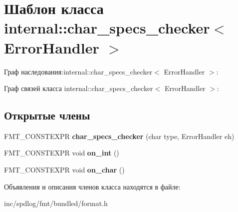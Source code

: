 \hypertarget{classinternal_1_1char__specs__checker}{}\section{Шаблон класса internal\+:\+:char\+\_\+specs\+\_\+checker$<$ Error\+Handler $>$}
\label{classinternal_1_1char__specs__checker}


Граф наследования\+:internal\+:\+:char\+\_\+specs\+\_\+checker$<$ Error\+Handler $>$\+:


Граф связей класса internal\+:\+:char\+\_\+specs\+\_\+checker$<$ Error\+Handler $>$\+:
\subsection*{Открытые члены}
\begin{DoxyCompactItemize}
\item 
\mbox{\label{classinternal_1_1char__specs__checker_a67c209630264fd9d4e82c806ce78f5e9}} 
F\+M\+T\+\_\+\+C\+O\+N\+S\+T\+E\+X\+PR {\bfseries char\+\_\+specs\+\_\+checker} (char type, Error\+Handler eh)
\item 
\mbox{\label{classinternal_1_1char__specs__checker_ad73dc97475d308a789f4bb1581211bec}} 
F\+M\+T\+\_\+\+C\+O\+N\+S\+T\+E\+X\+PR void {\bfseries on\+\_\+int} ()
\item 
\mbox{\label{classinternal_1_1char__specs__checker_a332bcf72661fd9a020834a5b17d352e8}} 
F\+M\+T\+\_\+\+C\+O\+N\+S\+T\+E\+X\+PR void {\bfseries on\+\_\+char} ()
\end{DoxyCompactItemize}


Объявления и описания членов класса находятся в файле\+:\begin{DoxyCompactItemize}
\item 
inc/spdlog/fmt/bundled/format.\+h\end{DoxyCompactItemize}
